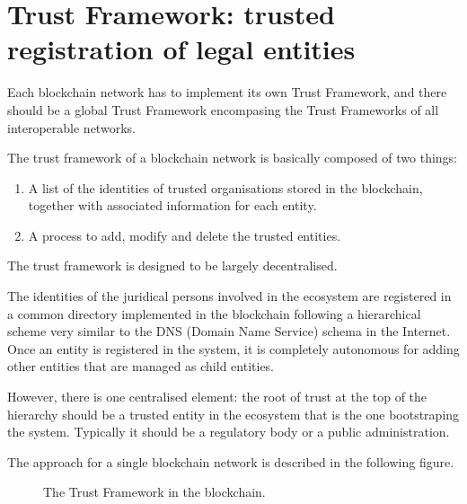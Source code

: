 \documentclass[a4paper,12pt,english]{sphinxhowto}
\begin{document}
\section{Trust Framework: trusted registration of legal entities}
\label{\detokenize{ssi/trustframework:trust-framework-trusted-registration-of-legal-entities}}\label{\detokenize{ssi/trustframework::doc}}
\sphinxAtStartPar
Each blockchain network has to implement its own Trust Framework, and there should be a global Trust Framework encompasing the Trust Frameworks of all interoperable networks.

\sphinxAtStartPar
The trust framework of a blockchain network is basically composed of two things:
\begin{enumerate}
%
\item {} 
\sphinxAtStartPar
A list of the identities of trusted organisations stored in the blockchain, together with associated information for each entity.

\item {} 
\sphinxAtStartPar
A process to add, modify and delete the trusted entities.

\end{enumerate}

\sphinxAtStartPar
The trust framework is designed to be largely decentralised.

\sphinxAtStartPar
The identities of the juridical persons involved in the ecosystem are registered in a common directory implemented in the blockchain following a hierarchical scheme very similar to the DNS (Domain Name Service) schema in the Internet. Once an entity is registered in the system, it is completely autonomous for adding other entities that are managed as child entities.

\sphinxAtStartPar
However, there is one centralised element: the root of trust at the top of the hierarchy should be a trusted entity in the ecosystem that is the one bootstraping the system. Typically it should be a regulatory body or a public administration.

\sphinxAtStartPar
The approach for a single blockchain network is described in the following figure.

\begin{figure}[htbp]
\centering
\capstart

\noindent{}
\caption{The Trust Framework in the blockchain.}\label{\detokenize{ssi/trustframework:id1}}\end{figure}
\end{document}
